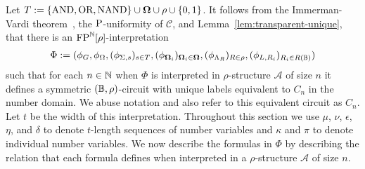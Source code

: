 \documentclass[../main/thesis.tex]{subfiles}
\begin{document}
Let $T := \{\text{\upshape AND}, \text{\upshape OR}, \text{\upshape NAND}\} \cup \mathbf{\mathbf{\Omega}} \cup \rho \cup \{0,1\}$. It follows
from the Immerman-Vardi theorem~\cite{Immerman198686, Vardi:1982}, the
$\mathrm{P}$-uniformity of $\mathcal{C}$, and Lemma~\ref{lem:transparent-unique}, that
there is an $\text{\upshape FP}^{\mathbb{N}}[\rho]$-interpretation
\begin{align*}
  \Phi := (\phi_G,
  \phi_\Omega, (\phi_{\Sigma, s})_{ s \in T},
  (\phi_{\mathbf{\mathbf{\Omega}}_i})_{\mathbf{\mathbf{\Omega}}_i \in \mathbf{\mathbf{\Omega}}}, (\phi_{\Lambda_R})_{R \in \rho},
  (\phi_{L, R_i})_{R_i \in R(\mathbb{B})})
\end{align*}
such that for each $n \in \mathbb{N}$ when $\Phi$ is interpreted in $\rho$-structure
$\mathcal{A}$ of size $n$ it defines a symmetric $(\mathbb{B}, \rho)$-circuit with
unique labels equivalent to $C_n$ in the number domain. We abuse notation and
also refer to this equivalent circuit as $C_n$. Let $t$ be the width of this
interpretation. Throughout this section we use $\mu$, $\nu$, $\epsilon$, $\eta$,
and $\delta$ to denote $t$-length sequences of number variables and $\kappa$ and
$\pi$ to denote individual number variables. We now describe the formulas in
$\Phi$ by describing the relation that each formula defines when interpreted in
a $\rho$-structure $\mathcal{A}$ of size $n$.
\end{document}
